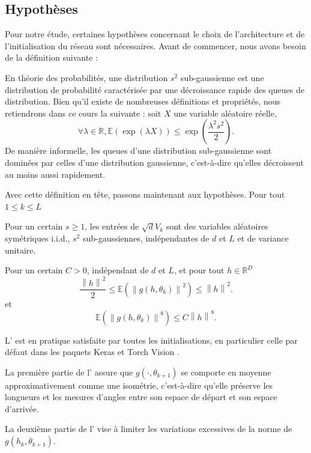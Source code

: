 \subsection*{Hypothèses}
Pour notre étude, certaines hypothèses concernant le choix de l'architecture et de l'initialisation du réseau sont nécessaires. Avant de commencer, nous avons besoin de la définition suivante :
\begin{definition}
    En théorie des probabilités, une distribution $s^2$ sub-gaussienne est une distribution de probabilité caractérisée par une décroissance rapide des queues de distribution. Bien qu'il existe de nombreuses définitions et propriétés, nous retiendrons dans ce cours la suivante : soit $X$ une variable aléatoire réelle,
    \[
        \forall \lambda \in \mathbb{R}, \mathbb{E}(\exp(\lambda X)) \leqslant \exp\left(\frac{\lambda^2 s^2}{2}\right).
    \]
    De manière informelle, les queues d'une distribution sub-gaussienne sont dominées par celles d'une distribution gaussienne, c'est-à-dire qu'elles décroissent au moins aussi rapidement.
\end{definition}
Avec cette définition en tête, passons maintenant aux hypothèses. Pour tout $ 1 \leqslant  k \leqslant L  $
\begin{assumption}\label{H1}
    Pour un certain $ s \geqslant 1 $, les entrées de  $ \sqrt{d}V_k $ sont des variables aléatoires symétriques i.i.d., $ s^2 $ sub-gaussiennes, indépendantes de $ d $ et $ L $ et de variance unitaire.
\end{assumption}
    
\begin{assumption}\label{H2}
    Pour un certain $ C > 0 $, indépendant de $ d $ et $ L $, et pour tout $ h \in \mathbb{R}^D  $ 
    \[
        \frac{\left\| h \right\| ^2}{2 } \leqslant  \mathbb{E}( \left\|  g(h, \theta _ k ) \right\| ^2 ) \leqslant \left\| h \right\| ^2
    .\]
    et
    \[
        \mathbb{E } (\left\| g(h, \theta _k)  \right\| ^8 ) \leqslant C \left\| h  \right\| ^8
    .\]
\end{assumption}

\begin{note}
    L' est en pratique satisfaite par toutes les initialisations, en particulier celle par défaut dans les paquets Keras \citep{chollet2015keras} et Torch Vision \citep{torchvision2016}.

    La première partie de l' assure que $g(\cdot, \theta_{k+1})$ se comporte en moyenne approximativement comme une isométrie, c'est-à-dire qu'elle préserve les longueurs et les mesures d'angles entre son espace de départ et son espace d'arrivée.

    La deuxième partie de l' vise à limiter les variations excessives de la norme de $g(h_k, \theta_{k+1})$.
\end{note}

